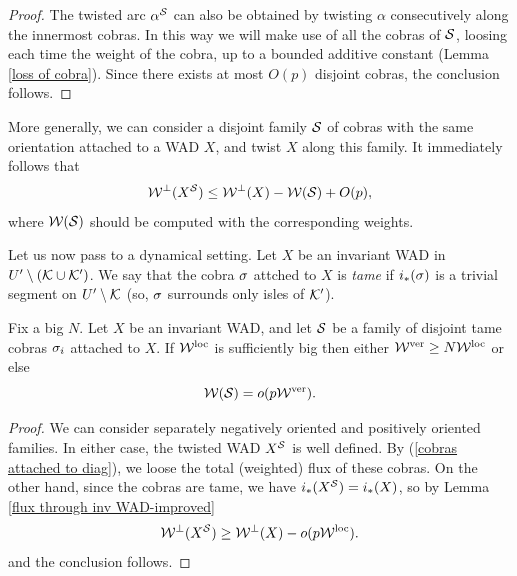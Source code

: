 {{\begin{proof}
  The twisted arc $\alpha^{\mathcal S}$ can also be obtained by twisting
  $\alpha$ consecutively along the innermost cobras. In this way we
  will make use of all the cobras of ${\mathcal S}$, 
loosing each time the weight of the cobra, up to a bounded additive
constant
(Lemma \ref{loss of cobra}). Since there exists at most $O(p)$
disjoint cobras, the conclusion follows.  
\end{proof}

More generally, we can consider a disjoint family ${\mathcal S}$  of  cobras
with the same orientation attached to
a WAD $X$, and twist $X$ along this family.  
It immediately follows that 
\begin{equation}\label{cobras attached to diag}
    {\mathcal W}^\perp(X^{\mathcal S}) \leq {\mathcal W}^\perp (X) - {\mathcal W}({\mathcal S}) + O(p), 
\end{equation}
where ${\mathcal W}({\mathcal S})$ should be computed with the corresponding weights. 

Let us now pass to a dynamical setting. 
Let $X$ be an invariant WAD in $U'\setminus ({\mathcal K} \cup {\mathcal K}')$.
We say that the cobra ${\sigma}$  attched to $X$  is {\it tame} if $i_*({\sigma})$ is a trivial
segment on $U'\setminus {\mathcal K}$
(so, ${\sigma}$  surrounds only isles of ${\mathcal K}'$). 

\begin{lem}\label{tame cobras}
Fix a big $N$.
Let $X$ be an invariant WAD, 
and let $ {\mathcal S} $  be a family  of disjoint  tame cobras ${\sigma}_i$
attached to $X$.  
If ${\mathcal W}^{\mathrm{loc}}$ is sufficiently big then either ${\mathcal W}^{\mathrm {ver}}\geq N {\mathcal W}^{\mathrm{loc}}$ or else
$$
      {\mathcal W} ({\mathcal S})   = o ( p {\mathcal W}^{\mathrm {ver}} ).   
$$
\end{lem} 

\begin{proof}
We can consider separately negatively oriented and positively oriented
families. In either case,  the twisted WAD $X^{\mathcal S}$  is  well defined. 
By (\ref{cobras attached to diag}),  
 we loose the total (weighted) flux of these cobras.
On the other hand, since the cobras are tame, we have $i_*(X^{\mathcal S}) =
  i_*(X)$, so by Lemma \ref{flux through inv WAD-improved}
$$
     {\mathcal W}^\perp (X^{\mathcal S}) \geq {\mathcal W}^\perp (X) -  o ( p  {\mathcal W}^{\mathrm{loc}}).
$$
and the conclusion follows. 
\end{proof}


}}
